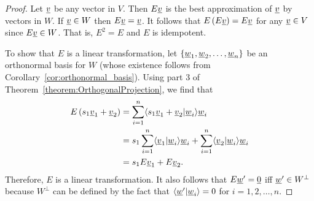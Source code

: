 \begin{proof}
Let $\underline{v}$ be any vector in $V$.
Then $E \vecnot{v}$ is the best approximation of $\underline{v}$ by vectors in $W$.
If $\underline{v} \in W$ then $E \underline{v} = \underline{v}$.
It follows that $E \left( E \underline{v} \right) = E \underline{v}$ for any $\vecnot{v} \in V$ since $E \underline{v} \in W$.
That is, $E^2 = E$ and $E$ is idempotent.

To show that $E$ is a linear transformation, let $\{ \underline{w}_1 , \underline{w}_2 , \ldots , \underline{w}_n \}$ be an orthonormal basis for $W$ (whose existence follows from Corollary~\ref{cor:orthonormal_basis}).
Using part 3 of Theorem~\ref{theorem:OrthogonalProjection}, we find that
\begin{align*}
E \left( s_1 \underline{v}_1 + \underline{v}_2 \right)
& = \sum_{i=1}^n \langle  s_1 \underline{v}_1 + \underline{v}_2 | \underline{w}_i \rangle \underline{w}_i \\
& = s_1 \sum_{i=1}^n \langle  \underline{v}_1 | \underline{w}_i \rangle \underline{w}_i + \sum_{i=1}^n \langle  \underline{v}_2 | \underline{w}_i \rangle \underline{w}_i \\
& = s_1 E \underline{v}_1 + E \underline{v}_2.
\end{align*}
Therefore, $E$ is a linear transformation.
It also follows that $E \underline{w}' = \underline{0}$ iff $\underline{w}' \in W^{\bot}$ because $W^{\bot}$ can be defined by the fact that $\langle \underline{w}' | \underline{w}_i \rangle = 0$ for $i=1,2,\ldots,n$.

\iffalse
To show that $E$ is a linear transformation, consider vectors $\vecnot{v}_1, \vecnot{v}_2 \in V$ and scalar $s \in F$.
Then $\vecnot{v}_1 - E \vecnot{v}_1$ and $\vecnot{v}_2 - E \vecnot{v}_2$ are each orthogonal to every vector in $W$.
The vector
\begin{equation*}
s \left( \vecnot{v}_1 - E \vecnot{v}_1 \right) + \left( \vecnot{v}_2 - E \vecnot{v}_2 \right) = \left( s \vecnot{v}_1 + \vecnot{v}_2 \right) - \left( s E \vecnot{v}_1 + E \vecnot{v}_2 \right)
\end{equation*}
is therefore also orthogonal to every vector in $W$.
Since $s E \vecnot{v}_1 + E \vecnot{v}_2$ is a vector in $W$, it follows from Theorem~\ref{theorem:OrthogonalProjection} that
\begin{equation*}
E \left( s \vecnot{v}_1 + \vecnot{v}_2 \right) = s E \vecnot{v}_1 + E \vecnot{v}_2.
\end{equation*}
That is, $E$ is a linear transformation.

Again, let $\vecnot{v} \in V$.
Then $E \vecnot{v}$ is the unique vector in $W$ such that $\vecnot{v} - E \vecnot{v}$ is in $W^{\bot}$.
In particular, $E \vecnot{v} = \vecnot{0}$ when $\vecnot{v} \in W^{\bot}$.
Conversely, if $E \vecnot{v} = \vecnot{0}$ then $\vecnot{v} \in W^{\bot}$.
Thus $W^{\bot}$ is the nullspace of $E$.
The equation
\begin{equation*}
\vecnot{v} = E \vecnot{v} + \vecnot{v} - E \vecnot{v}
\end{equation*}
shows that $V = W + W^{\bot}$.
Furthermore, $W \cap W^{\bot} = \left\{ \vecnot{0} \right\}$.
Hence $V$ is the direct sum of $W$ and $W^{\bot}$.
\fi


\end{proof}
